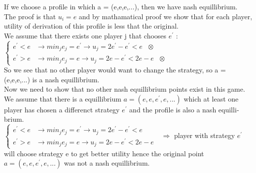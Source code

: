 \begin{latin}
        If we choose a profile in which a = (e,e,e,...), then we have nash equillibrium.\\
        The proof is that $u_i = e$ and by mathamatical proof we show that for each player, utility of derivation of this profile 
        is less that the original.\\
        We assume that there exists one player j that chooses $e^{'}$ : \\
        $\begin{cases}
            e^{'} < e & \rightarrow min_j e_j = e^{'} \rightarrow u_j = 2e ^{'} - e ^{'} < e \text{   }\otimes\\
            e^{'} > e & \rightarrow min_j e_j = e \rightarrow u_j = 2e - e^{'} < 2e - e \text{   } \otimes
        \end{cases}$
        \\
        So we see that no other player would want to change the strategy, so a = (e,e,e,...) is a nash equillibrium.
        \\
        Now we need to show that no other nash equillibrium points exist in this game.\\
        We assume that there is a equillibrium $a = (e,e,e^{'},e,...)$ which at least one player has chosen a differenct strategy $e^{'}$ and the profile is also a nash equillibrium.\\
        $\begin{cases}
            e^{'} < e & \rightarrow min_j e_j = e^{'} \rightarrow u_j = 2e ^{'} - e ^{'} < e \text{   } \\
            e^{'} > e & \rightarrow min_j e_j = e \rightarrow u_j = 2e - e^{'} < 2e - e \text{   } 
        \end{cases}  \Rightarrow $ player with strategy $e^{'}$ will choose strategy e to get better utility hence the original point $a = (e,e,e^{'},e,...)$ was not a nash equillibrium.
\end{latin}